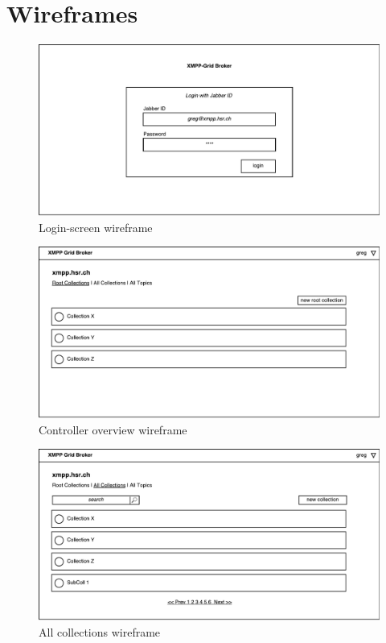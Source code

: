 
\section{Wireframes}\label{sec:wireframes}

\begin{figure}[h]
    \centering
    \includegraphics[width=1\linewidth]{resources/wireframe_1}
    \caption{Login-screen wireframe}
\end{figure}

\begin{figure}[h]
    \centering
    \includegraphics[width=1\linewidth]{resources/wireframe_2}
    \caption{Controller overview wireframe}
\end{figure}

\begin{figure}[h]
    \centering
    \includegraphics[width=1\linewidth]{resources/wireframe_3}
    \caption{All collections wireframe}
\end{figure}


